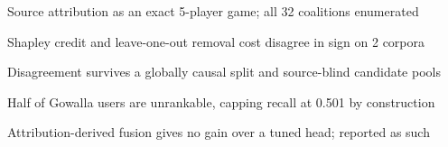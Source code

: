 \begin{highlights}
\item Source attribution as an exact 5-player game; all 32 coalitions enumerated
\item Shapley credit and leave-one-out removal cost disagree in sign on 2 corpora
\item Disagreement survives a globally causal split and source-blind candidate pools
\item Half of Gowalla users are unrankable, capping recall at 0.501 by construction
\item Attribution-derived fusion gives no gain over a tuned head; reported as such
\end{highlights}

